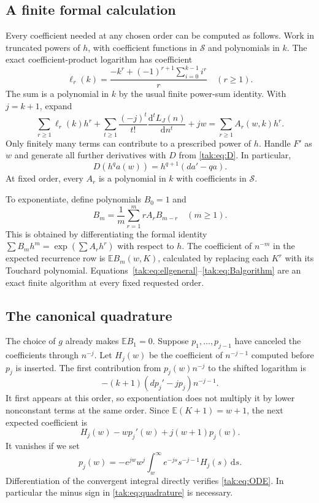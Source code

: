 \documentclass[11pt,letterpaper]{article}
\theoremstyle{remark}\newtheorem{remark}[theorem]{Remark}
\newcommand{\E}{\mathbb E}\newcommand{\Pp}{\mathbb P}
\newcommand{\cS}{\mathcal S}\newcommand{\cL}{\mathcal L}
\newcommand{\dd}{\mathrm d}\newcommand{\OO}{\mathcal O}
\begin{document}
\subsection{A finite formal calculation}
Every coefficient needed at any chosen order can be computed as follows. Work in truncated powers of $h$, with coefficient functions in $\cS$ and polynomials in $k$. The exact coefficient-product logarithm has coefficient
\begin{equation}
 \ell_r(k)=\frac{-k^r+(-1)^{r+1}\sum_{i=0}^{k-1}i^r}{r}\quad(r\geq1).\label{tak:eq:ellgeneral}
\end{equation}
The sum is a polynomial in $k$ by the usual finite power-sum identity. With $j=k+1$, expand
\begin{equation}
 \sum_{r\geq1}\ell_r(k)h^r
  +\sum_{t\geq1}\frac{(-j)^t}{t!}\frac{\dd^t L_J(n)}{\dd n^t}+jw
    =\sum_{r\geq1}A_r(w,k)h^r.\label{tak:eq:Aalgorithm}
\end{equation}
Only finitely many terms can contribute to a prescribed power of $h$. Handle $F'$ as $w$ and generate all further derivatives with $D$ from \eqref{tak:eq:D}. In particular,
\[
 D(h^q a(w))=h^{q+1}(da'-qa).
\]
At fixed order, every $A_r$ is a polynomial in $k$ with coefficients in $\cS$.

To exponentiate, define polynomials $B_0=1$ and
\begin{equation}
 B_m=\frac1m\sum_{r=1}^m rA_rB_{m-r}\quad(m\geq1).\label{tak:eq:Balgorithm}
\end{equation}
This is obtained by differentiating the formal identity
$\sum B_mh^m=\exp(\sum A_rh^r)$ with respect to $h$. The coefficient of $n^{-m}$ in the expected recurrence row is $\E B_m(w,K)$, calculated by replacing each $K^r$ with its Touchard polynomial. Equations~\eqref{tak:eq:ellgeneral}--\eqref{tak:eq:Balgorithm} are an exact finite algorithm at every fixed requested order.

\subsection{The canonical quadrature}
The choice of $g$ already makes $\E B_1=0$. Suppose $p_1,\ldots,p_{j-1}$ have canceled the coefficients through $n^{-j}$. Let $H_j(w)$ be the coefficient of $n^{-j-1}$ computed before $p_j$ is inserted. The first contribution from $p_j(w)n^{-j}$ to the shifted logarithm is
\[
 -(k+1)(dp_j'-jp_j)n^{-j-1}.
\]
It first appears at this order, so exponentiation does not multiply it by lower nonconstant terms at the same order. Since $\E(K+1)=w+1$, the next expected coefficient is
\begin{equation}
 H_j(w)-wp_j'(w)+j(w+1)p_j(w).\label{tak:eq:ODE}
\end{equation}
It vanishes if we set
\begin{equation}
 \boxed{\displaystyle
 p_j(w)=-e^{jw}w^j\int_w^\infty e^{-js}s^{-j-1}H_j(s)\,\dd s.}\label{tak:eq:quadrature}
\end{equation}
Differentiation of the convergent integral directly verifies \eqref{tak:eq:ODE}. In particular the minus sign in \eqref{tak:eq:quadrature} is necessary.
\end{document}
